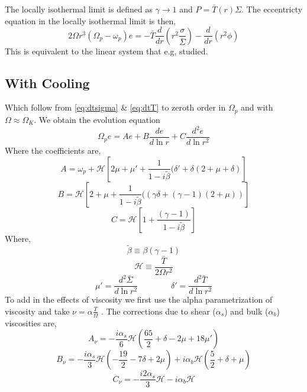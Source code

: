 \documentclass[apj]{emulateapj}
\begin{document}
The locally isothermal limit is defined as $\gamma \rightarrow 1$ and $P = \bar{T}(r) \Sigma$. The eccentricty equation in the locally isothermal limit is then,
\begin{equation}
2 \Omega r^3 ( \Omega_p - \omega_p) e = - \bar{T} \frac{d}{dr} \left( r^2 \frac{\sigma}{\bar{\Sigma}} \right) - \frac{d}{dr} \left( r^2 \phi \right) 
\end{equation}
This is equivalent to the linear system that e.g, \citet{lin15} studied. 
 
\subsection{With Cooling}



Which follow from \eqref{eq:dtsigma} \& \eqref{eq:dtT} to zeroth order in $\Omega_p$ and with $\Omega \approx \Omega_K$. We obtain the evolution equation 
\begin{equation} \label{eq:coeff_eqn}
\Omega_p e  = A e + B \frac{d e}{d \ln r} + C  \frac{d^2 e}{ d \ln r^2}
\end{equation}
Where the coefficients are,
\begin{equation}
A = \omega_p  + \mathcal{H} \left[ 2 \mu + \mu'  + \frac{1}{1 - i  \tilde{\beta}} ( \delta' + \delta (2 + \mu + \delta) \right]
\end{equation}
\begin{equation}
B = \mathcal{H} \left[ 2 + \mu + \frac{1}{1 - i \tilde{\beta}} ( \left( \gamma \delta + (\gamma -1 ) (2 + \mu) \right) \right]
\end{equation}
\begin{equation}
C = \mathcal{H} \left[ 1 +  \frac{(\gamma - 1)}{1 - i  \tilde{\beta}} \right]
\end{equation}
Where,
\begin{equation}
\tilde{ \beta} \equiv \beta ( \gamma - 1)
\end{equation}
\begin{equation}
\mathcal{H} \equiv \frac{  \bar{T}}{ 2 \Omega r^2}
\end{equation}
\begin{equation}
\mu ' = \frac{d ^2 \bar{\Sigma}}{d \ln r^2} 
\qquad \qquad
\delta' = \frac{d ^2 \bar{T}}{d \ln r^2}
\end{equation}
To add in the effects of viscosity we first use the alpha parametrization of viscosity and take $\nu = \alpha \frac{T}{\Omega}$ \citep{ss73}. The corrections due to shear ($\alpha_s$) and bulk ($\alpha_b$) viscosities are, 
\begin{equation}
A_\nu = -\frac{i \alpha_s}{6} \mathcal{H} \left( \frac{65}{2} + \delta - 2 \mu + 18 \mu' \right)
\end{equation}
\begin{equation}
B_\nu = -\frac{ i \alpha_s}{3} \mathcal{H} \left( -\frac{19}{2} - 7 \delta + 2 \mu \right) +  i \alpha_b \mathcal{H} \left( \frac{5}{2} + \delta + \mu \right)
\end{equation}
\begin{equation}
C_\nu = - \frac{ i 2\alpha_s}{3} \mathcal{H}  - i \alpha_b \mathcal{H}
\end{equation}
\end{document}
